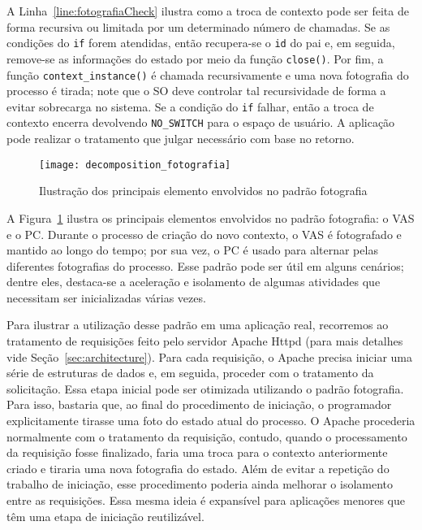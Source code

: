 A Linha~\ref{line:fotografiaCheck} ilustra como a troca de contexto pode ser
feita de forma recursiva ou limitada por um determinado número de chamadas. Se
as condições do \texttt{if} forem atendidas, então recupera-se o \texttt{id} do
pai e, em seguida, remove-se as informações do estado por meio da função
\texttt{close()}. Por fim, a função \texttt{context\_instance()} é chamada
recursivamente e uma nova fotografia do processo é tirada; note que o SO deve
controlar tal recursividade de forma a evitar sobrecarga no sistema. Se a
condição do \texttt{if} falhar, então a troca de contexto encerra devolvendo
\texttt{NO\_SWITCH} para o espaço de usuário. A aplicação pode realizar o
tratamento que julgar necessário com base no retorno.

\begin{figure}[!h]
  \centering
  \texttt{[image: decomposition\_fotografia]}
  \caption{Ilustração dos principais elemento envolvidos no padrão fotografia}
  \label{fig:decomposicao_fotografia}
\end{figure}

A Figura~\ref{fig:decomposicao_fotografia} ilustra os principais elementos
envolvidos no padrão fotografia: o VAS e o PC. Durante o processo de
criação do novo contexto, o VAS é fotografado e mantido ao longo do tempo; por
sua vez, o PC é usado para alternar pelas diferentes fotografias do processo.
Esse padrão pode ser útil em alguns cenários; dentre eles, destaca-se a
aceleração e isolamento de algumas atividades que necessitam ser inicializadas
várias vezes.

Para ilustrar a utilização desse padrão em uma aplicação real, recorremos
ao tratamento de requisições feito pelo servidor Apache Httpd (para mais
detalhes vide Seção~\ref{sec:architecture}). Para cada requisição, o Apache
precisa iniciar uma série de estruturas de dados e, em seguida, proceder
com o tratamento da solicitação. Essa etapa inicial pode ser otimizada
utilizando o padrão fotografia. Para isso, bastaria que, ao final do procedimento de
iniciação, o programador explicitamente tirasse uma foto do estado atual do
processo. O Apache procederia normalmente com o tratamento da requisição,
contudo, quando o processamento da requisição fosse finalizado, faria uma troca para o
contexto anteriormente criado e tiraria uma nova fotografia do estado. Além de
evitar a repetição do trabalho de iniciação, esse procedimento poderia ainda
melhorar o isolamento entre as requisições. Essa mesma ideia é expansível para
aplicações menores que têm uma etapa de iniciação reutilizável.

